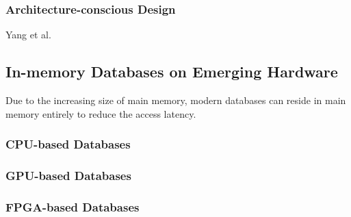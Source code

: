 \subsubsection{Architecture-conscious Design}
Yang et al. \cite{Yang2012}


\subsection{In-memory Databases on Emerging Hardware}
Due to the increasing size of main memory, modern databases can reside in main memory entirely to reduce the access latency. 
\subsubsection{CPU-based Databases}

\subsubsection{GPU-based Databases}

\subsubsection{FPGA-based Databases}
